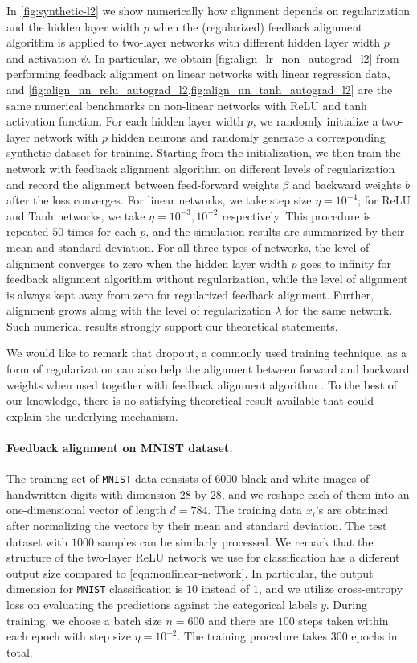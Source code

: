 In \cref{fig:synthetic-l2} we show numerically how alignment depends on regularization and the hidden layer width $p$ when the (regularized) feedback alignment algorithm is applied to two-layer networks with different hidden layer width $p$ and activation $\psi$. In particular, we obtain \cref{fig:align_lr_non_autograd_l2} from performing feedback alignment on linear networks with linear regression data, and \cref{fig:align_nn_relu_autograd_l2,fig:align_nn_tanh_autograd_l2} are the same numerical benchmarks on non-linear networks with ReLU and tanh activation function. For each hidden layer width $p$, we randomly initialize a two-layer network with $p$ hidden neurons and randomly generate a corresponding synthetic dataset for training. Starting from the initialization, we then train the network with feedback alignment algorithm on different levels of regularization and record the alignment between feed-forward weights $\beta$ and backward weights $b$ after the loss converges. For linear networks, we take step size $\eta = 10^{-4}$; for ReLU and Tanh networks, we take $\eta = 10^{-3},10^{-2}$ respectively. This procedure is repeated $50$ times for each $p$, and the simulation results are summarized by their mean and standard deviation. For all three types of networks, the level of alignment converges to zero when the hidden layer width $p$ goes to infinity for feedback alignment algorithm without regularization, while the level of alignment is always kept away from zero for regularized feedback alignment. Further, alignment grows along with the level of regularization $\lambda$ for the same network. Such numerical results strongly support our theoretical statements.

We would like to remark that dropout, a commonly used training technique, as a form of regularization can also help the alignment between forward and backward weights when used together with feedback alignment algorithm \citep{wager2013dropout}. To the best of our knowledge, there is no satisfying theoretical result available that could explain the underlying mechanism.


\paragraph{Feedback alignment on MNIST dataset.}

The training set of \texttt{MNIST} data consists of $6000$ black-and-white images of handwritten digits with dimension $28$ by $28$, and we reshape each of them into an one-dimensional vector of length $d = 784$. The training data $x_i$'s are obtained after normalizing the vectors by their mean and standard deviation. The test dataset with $1000$ samples can be similarly processed. We remark that the structure of the two-layer ReLU network we use for classification has a different output size compared to \eqref{eqn:nonlinear-network}. In particular, the output dimension for \texttt{MNIST} classification is $10$ instead of $1$, and we utilize cross-entropy loss on evaluating the predictions against the categorical labels $y$. During training, we choose a batch size $n = 600$ and there are $100$ steps taken within each epoch with step size $\eta = 10^{-2}$. The training procedure takes $300$ epochs in total. 

